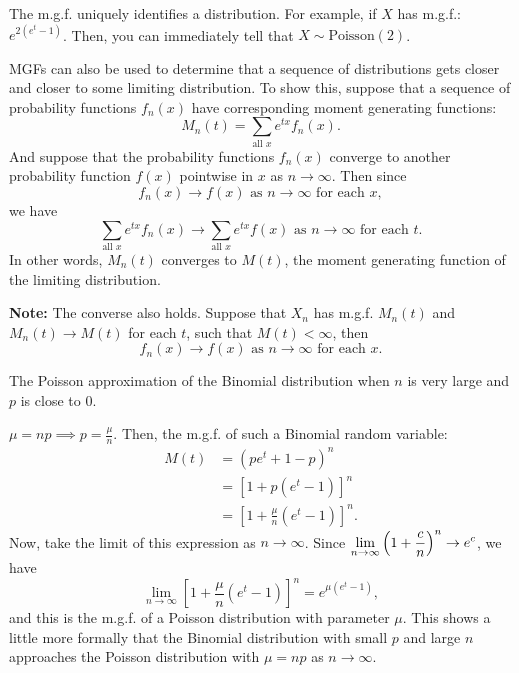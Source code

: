 The m.g.f. uniquely identifies a distribution. For example, if $X$ has m.g.f.: $e^{2(e^t -1)}$. Then, you can immediately tell that $X \sim \text{Poisson}(2)$.

MGFs can also be used to determine that a sequence of distributions gets closer and closer to some limiting distribution. To show this, suppose that a sequence of probability functions $f_n(x)$ have corresponding moment generating functions: \vspace{-3mm}
\[
    M_n(t) = \displaystyle \sum_{\text{all $x$}} e^{tx} f_n(x).
\]
And suppose that the probability functions $f_n(x)$ converge to another probability function $f(x)$ pointwise in $x$ as $n \to \infty$. Then since
\vspace{-3mm}
\[
    f_n(x) \to f(x) \text{ as $n \to \infty$ for each $x$},
\]
we have \vspace{-3mm}
\[
    \sum_{\text{all $x$}} e^{tx} f_n(x) \to \sum_{\text{all $x$}} e^{tx} f(x) \text{ as $n \to \infty$ for each $t$}.
\]
In other words, $M_n(t)$ converges to $M(t)$, the moment generating function of the limiting distribution.

\textbf{Note:} The converse also holds. Suppose that $X_n$ has m.g.f. $M_n(t)$ and $M_n(t) \to M(t)$ for each $t$, such that $M(t) < \infty$, then
\vspace{-3mm}
\[
    f_n(x) \to f(x) \text{ as $n \to \infty$ for each $x$}.
\]

\begin{example}
    The Poisson approximation of the Binomial distribution when $n$ is very large and $p$ is close to 0.

    $\mu = np \implies p = \frac{\mu}{n}$. Then, the m.g.f. of such a Binomial random variable:
    \begin{align*}
        M(t) &= (pe^t + 1 - p)^n \\
        &= \left[ 1 + p(e^t -1) \right]^n \\
        &= \left[ 1 + \frac{\mu}{n} (e^t -1) \right]^n.
    \end{align*}
    Now, take the limit of this expression as $n \to \infty$. Since $\displaystyle \lim_{n \to \infty} \left( 1 + \frac{c}{n} \right)^n \to e^c$, we have
    \[
        \lim_{n \to \infty} \left[ 1 + \frac{\mu}{n} (e^t -1) \right]^n = e^{\mu(e^t -1)},
    \]
    and this is the m.g.f. of a Poisson distribution with parameter $\mu$. This shows a little more formally that the Binomial distribution with small $p$ and large $n$ approaches the Poisson distribution with $\mu = np$  as $n \to \infty$.
\end{example}

